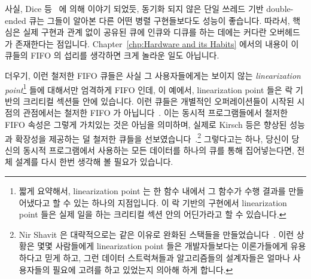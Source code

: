 사실, Dice 등~\cite{DavidDice:2010:SCA:HTM:deque} 에 의해 이야기 되었듯, 동기화
되지 않은 단일 쓰레드 기반 double-ended 큐는 그들이 알아본 다른 어떤 병렬
구현들보다도 성능이 좋습니다.
따라서, 핵심은 실제 구현과 관계 없이 공유된 큐에 인큐와 디큐를 하는 데에는
커다란 오버헤드가 존재한다는 점입니다.
Chapter~\ref{chp:Hardware and its Habits} 에서의 내용이 이 큐들의 FIFO 의
섭리를 생각하면 크게 놀라운 일도 아닙니다.

더우기, 이런 철저한 FIFO 큐들은 사실 그 사용자들에게는 보이지 않는
\emph{linearization point}\footnote{
	짧게 요약해서, linearization point 는 한 함수 내에서 그 함수가 수행
	결과를 만들어냈다고 할 수 있는 하나의 지점입니다.
	이 락 기반의 구현에서 linearization point 들은 실제 일을 하는 크리티컬
	섹션 안의 어딘가라고 할 수 있습니다.}
들에 대해서만 엄격하게 FIFO 인데, 이 예에서, linearization point 들은 락 기반의
크리티컬 섹션들 안에 있습니다.
이런 큐들은 개별적인 오퍼레이션들이 시작된 시점의 관점에서는 철저한 FIFO 가
아닙니다~\cite{AndreasHaas2012FIFOisnt}.
이는 동시적 프로그램들에서 철저한 FIFO 속성은 그렇게 가치있는 것은 아님을
의미하며, 실제로 Kirsch 등은 향상된 성능과 확장성을 제공하는 덜 철저한 큐들을
선보였습니다~\cite{ChristophMKirsch2012FIFOisntTR}.\footnote{
	Nir Shavit 은 대략적으로는 같은 이유로 완화된 스택들을
	만들었습니다~\cite{Shavit:2011:DSM:1897852.1897873}.
	이런 상황은 몇몇 사람들에게 linearization point 들은 개발자들보다는
	이론가들에게 유용하다고 믿게 하고, 그런 데이터 스트럭쳐들과
	알고리즘들의 설계자들은 얼마나 사용자들의 필요에 고려를 하고 있었는지
	의아해 하게 합니다.}
그렇다고는 하나, 당신이 당신의 동시적 프로그램에서 사용하는 모든 데이터를
하나의 큐를 통해 집어넣는다면, 전체 설계를 다시 한번 생각해 볼 필요가 있습니다.
\iffalse

